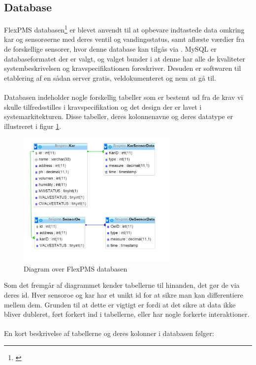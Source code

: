 \subsection{Database}
FlexPMS databasen\footnote{\citet{oracle:mysql}} er blevet anvendt til at opbevare indtastede data omkring kar og sensorøerne med deres ventil og vandingsstatus, samt aflæste værdier fra de forskellige sensorer, hvor denne database kan tilgås via . MySQL er databaseformatet der er valgt, og valget bunder i at denne har alle de kvaliteter systembeskrivelsen og kravspecifikationen foreskriver. Desuden er softwaren til etablering af en sådan server gratis, veldokumenteret og nem at gå til.
\\\\
Databasen indeholder nogle forskellig tabeller som er bestemt ud fra de krav vi skulle tilfredsstilles i kravspecifikation og det design der er lavet i systemarkitekturen. Disse tabeller, deres kolonnenavne og deres datatype er illustreret i figur \ref{fig:DB}. 

\begin{figure}[H]
    \centering
    \includegraphics[width=0.7\textwidth]{SoftwareArkitektur/GUI/Intro_GUI_DB/photo/DB_diagram.PNG}
    \caption{Diagram over FlexPMS databasen}
    \label{fig:DB}
\end{figure}

Som det fremgår af diagrammet kender tabellerne til hinanden, det gør de via deres id. Hver \gls{sensoroe} og \gls{kar} har et unikt id for at sikre man kan differentiere mellem dem. Grunden til at dette er vigtigt er fordi at det sikre at data ikke bliver dubleret, ført forkert ind i tabellerne, eller har nogle forkerte interaktioner.
\\\\
En kort beskrivelse af tabellerne og deres kolonner i databasen følger:


